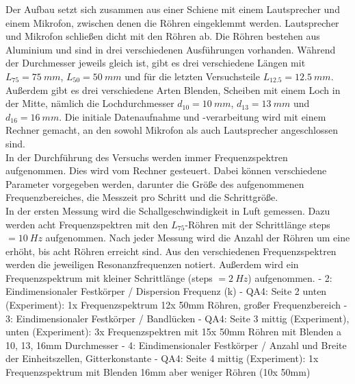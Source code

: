 
Der Aufbau setzt sich zusammen aus einer Schiene mit einem Lautsprecher und einem Mikrofon, zwischen denen die Röhren eingeklemmt werden.
Lautsprecher und Mikrofon schließen dicht mit den Röhren ab.
Die Röhren bestehen aus Aluminium und sind in drei verschiedenen Ausführungen vorhanden.
Während der Durchmesser jeweils gleich ist, gibt es drei verschiedene Längen mit $L_{75} = \SI{75}{mm}$, $L_{50} = \SI{50}{mm}$ und für die letzten Versuchsteile $L_{12.5} = \SI{12.5}{mm}$.
Außerdem gibt es drei verschiedene Arten Blenden, Scheiben mit einem Loch in der Mitte, nämlich die Lochdurchmesser $d_{10} = \SI{10}{mm}$, $d_{13} = \SI{13}{mm}$ und $d_{16} = \SI{16}{mm}$.
Die initiale Datenaufnahme und -verarbeitung wird mit einem Rechner gemacht, an den sowohl Mikrofon als auch Lautsprecher angeschlossen sind.\\
%
In der Durchführung des Versuchs werden immer Frequenzspektren aufgenommen.
Dies wird vom Rechner gesteuert.
Dabei können verschiedene Parameter vorgegeben werden, darunter die Größe des aufgenommenen Frequenzbereiches, die Messzeit pro Schritt und die Schrittgröße.\\
In der ersten Messung wird die Schallgeschwindigkeit in Luft gemessen.
Dazu werden acht Frequenzspektren mit den $L_{75}$-Röhren mit der Schrittlänge steps $= \SI{10}{Hz}$ aufgenommen.
Nach jeder Messung wird die Anzahl der Röhren um eine erhöht, bis acht Röhren erreicht sind.
Aus den verschiedenen Frequenzspektren werden die jeweiligen Resonanzfrequenzen notiert.
Außerdem wird ein Frequenzspektrum mit kleiner Schrittlänge (steps $= \SI{2}{Hz}$) aufgenommen.
%
- 2: Eindimensionaler Festkörper / Dispersion Frequenz (k)
    - QA4: Seite 2 unten (Experiment): 1x Frequenzspektrum 12x 50mm Röhren, großer Frequenzbereich
- 3: Eindimensionaler Festkörper / Bandlücken
    - QA4: Seite 3 mittig (Experiment), unten (Experiment): 3x Frequenzspektren mit 15x 50mm Röhren mit Blenden a 10, 13, 16mm Durchmesser
- 4: Eindimensionaler Festkörper / Anzahl und Breite der Einheitszellen, Gitterkonstante
    - QA4: Seite 4 mittig (Experiment): 1x Frequenzspektrum mit Blenden 16mm aber weniger Röhren (10x 50mm)
